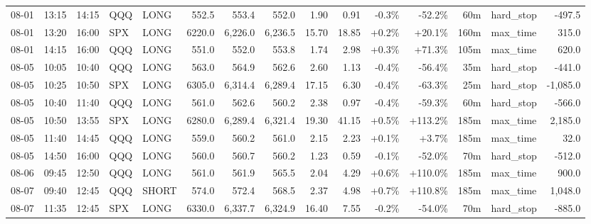 \documentclass[11pt,a4paper,twoside]{article}
\begin{document}
\begin{landscape}
\begin{center}
\begin{longtable}{>{\color{txtmain}}l l l l l r r r r r r r r >{\color{txtmain}}l r}
08-01 & 13:15 & 14:15 & QQQ & LONG & 552.5 & 553.4 & 552.0 & 1.90 & 0.91 & \textcolor{lossred}{-0.3\%} & \textcolor{lossred}{-52.2\%} & 60m & hard\_stop & \textcolor{lossred}{-497.5} \\
08-01 & 13:20 & 16:00 & SPX & LONG & 6220.0 & 6,226.0 & 6,236.5 & 15.70 & 18.85 & \textcolor{wingreen}{+0.2\%} & \textcolor{wingreen}{+20.1\%} & 160m & max\_time & \textcolor{wingreen}{315.0} \\
08-01 & 14:15 & 16:00 & QQQ & LONG & 551.0 & 552.0 & 553.8 & 1.74 & 2.98 & \textcolor{wingreen}{+0.3\%} & \textcolor{wingreen}{+71.3\%} & 105m & max\_time & \textcolor{wingreen}{620.0} \\
08-05 & 10:05 & 10:40 & QQQ & LONG & 563.0 & 564.9 & 562.6 & 2.60 & 1.13 & \textcolor{lossred}{-0.4\%} & \textcolor{lossred}{-56.4\%} & 35m & hard\_stop & \textcolor{lossred}{-441.0} \\
08-05 & 10:25 & 10:50 & SPX & LONG & 6305.0 & 6,314.4 & 6,289.4 & 17.15 & 6.30 & \textcolor{lossred}{-0.4\%} & \textcolor{lossred}{-63.3\%} & 25m & hard\_stop & \textcolor{lossred}{-1,085.0} \\
08-05 & 10:40 & 11:40 & QQQ & LONG & 561.0 & 562.6 & 560.2 & 2.38 & 0.97 & \textcolor{lossred}{-0.4\%} & \textcolor{lossred}{-59.3\%} & 60m & hard\_stop & \textcolor{lossred}{-566.0} \\
08-05 & 10:50 & 13:55 & SPX & LONG & 6280.0 & 6,289.4 & 6,321.4 & 19.30 & 41.15 & \textcolor{wingreen}{+0.5\%} & \textcolor{wingreen}{+113.2\%} & 185m & max\_time & \textcolor{wingreen}{2,185.0} \\
08-05 & 11:40 & 14:45 & QQQ & LONG & 559.0 & 560.2 & 561.0 & 2.15 & 2.23 & \textcolor{wingreen}{+0.1\%} & \textcolor{wingreen}{+3.7\%} & 185m & max\_time & \textcolor{wingreen}{32.0} \\
08-05 & 14:50 & 16:00 & QQQ & LONG & 560.0 & 560.7 & 560.2 & 1.23 & 0.59 & \textcolor{lossred}{-0.1\%} & \textcolor{lossred}{-52.0\%} & 70m & hard\_stop & \textcolor{lossred}{-512.0} \\
08-06 & 09:45 & 12:50 & QQQ & LONG & 561.0 & 561.9 & 565.5 & 2.04 & 4.29 & \textcolor{wingreen}{+0.6\%} & \textcolor{wingreen}{+110.0\%} & 185m & max\_time & \textcolor{wingreen}{900.0} \\
08-07 & 09:40 & 12:45 & QQQ & SHORT & 574.0 & 572.4 & 568.5 & 2.37 & 4.98 & \textcolor{wingreen}{+0.7\%} & \textcolor{wingreen}{+110.8\%} & 185m & max\_time & \textcolor{wingreen}{1,048.0} \\
08-07 & 11:35 & 12:45 & SPX & LONG & 6330.0 & 6,337.7 & 6,324.9 & 16.40 & 7.55 & \textcolor{lossred}{-0.2\%} & \textcolor{lossred}{-54.0\%} & 70m & hard\_stop & \textcolor{lossred}{-885.0} \\

\end{longtable}
\end{center}
\end{landscape}
\end{document}
